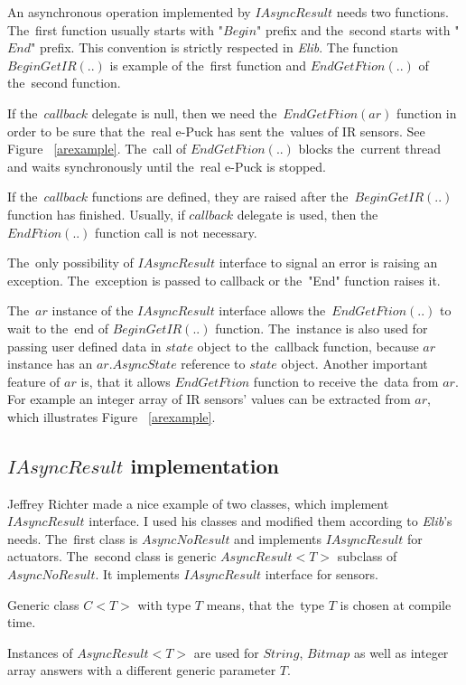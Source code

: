   An asynchronous operation implemented by $IAsyncResult$ needs two functions. 
  The~first function usually starts with 
  "$Begin$" prefix and the~second starts with "$End$" prefix. 
  This convention is strictly respected in {\it Elib}.
  The function $BeginGetIR(..)$ is example of the~first function and $EndGetFtion(..)$ of the~second function.

  If the~$callback$ delegate is null, then we need the~$EndGetFtion(ar)$ function
  in order to be sure that the~real e-Puck has sent the~values of IR sensors. 
  See Figure ~\ref{arexample}.
  The~call of $EndGetFtion(..)$ blocks the~current thread and waits synchronously until the~real
  e-Puck is stopped.

  If the~$callback$ functions are defined, they are raised after the~$BeginGetIR(..)$ function has finished.
  Usually, if $callback$ delegate is used, then the~$EndFtion(..)$ function call is not necessary.

  The~only possibility of $IAsyncResult$ interface to signal an error is raising an exception.
  The~exception is passed to callback or the~"End" function raises it.

  The~$ar$ instance of the $IAsyncResult$ interface allows the~$EndGetFtion(..)$ to wait to the~end of $BeginGetIR(..)$ function.
  The~instance is also used for passing user defined data in $state$ object to the~callback function,
  because $ar$ instance has an $ar.AsyncState$ reference to $state$ object.
  Another important feature of $ar$ is, that it allows $EndGetFtion$ function to receive the~data
  from $ar$. For example an integer array of IR sensors' values can be extracted from $ar$, which illustrates Figure ~\ref{arexample}.
  
\subsection{$IAsyncResult$ implementation} \label{sec:iasyncimpl}
  Jeffrey Richter \cite{IAsync} made a nice example of two classes, which implement $IAsyncResult$ interface.
  I used his classes and modified them according to {\it Elib}'s needs.
  The~first class is $AsyncNoResult$ and implements $IAsyncResult$ for actuators.
  The~second class is generic $AsyncResult<T>$ subclass of $AsyncNoResult$. 
  It implements $IAsyncResult$ interface for sensors.
  \begin{definition}
  Generic class $C<T>$ with type $T$ means, that the~type  $T$ is chosen at compile time. 
  \end{definition}
  Instances of $AsyncResult<T>$ are used
  for $String$, $Bitmap$ as well as integer array answers with a different generic parameter $T$.
    

